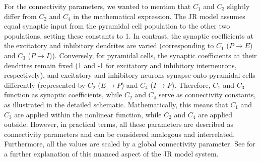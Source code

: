 \documentclass[12pt,twoside]{article}
\begin{document}
For the connectivity parameters, we wanted to mention that $C_{1}$ and $C_{3}$ slightly differ from $C_{2}$ and $C_{4}$ in the mathematical expression. The JR model assumes equal synaptic input from the pyramidal cell population to the other two populations, setting these constants to 1. In contrast, the synaptic coefficients at the excitatory and inhibitory dendrites are varied (corresponding to $C_{1}$ ($P \rightarrow E$) and $C_{3}$ ($P \rightarrow I$)). Conversely, for pyramidal cells, the synaptic coefficients at their dendrites remain fixed (1 and -1 for excitatory and inhibitory interneurons, respectively), and excitatory and inhibitory neurons synapse onto pyramidal cells differently (represented by $C_{2}$ ($E \rightarrow P$) and $C_{4}$ ($I \rightarrow P$). Therefore, $C_{1}$ and $C_{3}$ function as synaptic coefficients, while $C_{2}$ and $C_{4}$ serve as connectivity constants, as illustrated in the detailed schematic. Mathematically, this means that $C_{1}$ and $C_{3}$ are applied within the nonlinear function, while  $C_{2}$ and $C_{4}$ are applied outside. However, in practical terms, all these parameters are described as connectivity parameters and can be considered analogous and interrelated. Furthermore, all the values are scaled by a global connectivity parameter. 
See \citet{cook2021neural} for a further explanation of this nuanced aspect of the JR model system.
\end{document}
